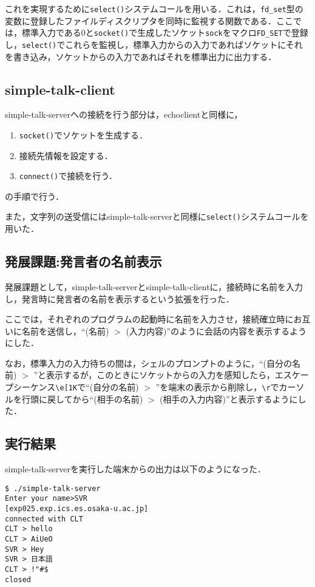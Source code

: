 \documentclass[a4j,10pt,titlepage]{jsarticle}
\begin{document}
これを実現するために\verb|select()|システムコールを用いる．これは，\verb|fd_set|型の変数に登録したファイルディスクリプタを同時に監視する関数である．ここでは，標準入力である0と\verb|socket()|で生成したソケット\verb|sock|をマクロ\verb|FD_SET|で登録し，\verb|select()|でこれらを監視し，標準入力からの入力であればソケットにそれを書き込み，ソケットからの入力であればそれを標準出力に出力する．

\subsection{simple-talk-client}
simple-talk-serverへの接続を行う部分は，echoclientと同様に，
\begin{enumerate}
	\item \verb|socket()|でソケットを生成する．
	\item 接続先情報を設定する．
	\item \verb|connect()|で接続を行う．
\end{enumerate}
の手順で行う．

また，文字列の送受信にはsimple-talk-serverと同様に\verb|select()|システムコールを用いた．

\subsection{発展課題:発言者の名前表示}
発展課題として，simple-talk-serverとsimple-talk-clientに，接続時に名前を入力し，発言時に発言者の名前を表示するという拡張を行った．

ここでは，それぞれのプログラムの起動時に名前を入力させ，接続確立時にお互いに名前を送信し，``(名前) $>$ (入力内容)''のように会話の内容を表示するようにした．

なお，標準入力の入力待ちの間は，シェルのプロンプトのように，``(自分の名前) $>$ ''と表示するが，このときにソケットからの入力を感知したら，エスケープシーケンス\verb|\e[1K|で``(自分の名前) $>$ ''を端末の表示から削除し，\verb|\r|でカーソルを行頭に戻してから``(相手の名前) $>$ (相手の入力内容)''と表示するようにした．

\subsection{実行結果}
simple-talk-serverを実行した端末からの出力は以下のようになった．
\begin{verbatim}
$ ./simple-talk-server
Enter your name>SVR
[exp025.exp.ics.es.osaka-u.ac.jp]
connected with CLT
CLT > hello
CLT > AiUeO
SVR > Hey
SVR > 日本語
CLT > !"#$
closed
\end{verbatim}
\end{document}
